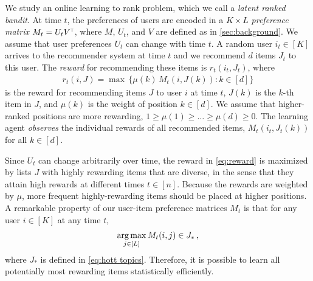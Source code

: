 
We study an online learning to rank problem, which we call a \emph{latent ranked bandit}. At time $t$, the preferences of users are encoded in a $K \times L$ \emph{preference matrix} $M_t = U_t V^\mathsf{\scriptscriptstyle T}$, where $M$, $U_t$, and $V$ are defined as in \cref{sec:background}. We assume that user preferences $U_t$ can change with time $t$. A random user $i_t \in [K]$ arrives to the recommender system at time $t$ and we recommend $d$ items $J_t$ to this user. The \emph{reward} for recommending these items is $r_t(i_t, J_t)$, where
\begin{align}
  r_t(i, J) =
  \max \, \{\mu(k) \, M_t(i, J(k)): k \in [d]\}
  \label{eq:reward}
\end{align}
is the reward for recommending items $J$ to user $i$ at time $t$, $J(k)$ is the $k$-th item in $J$, and $\mu(k)$ is the weight of position $k \in [d]$. We assume that higher-ranked positions are more rewarding, $1 \geq \mu(1) \geq \dots \geq \mu(d) \geq 0$. The learning agent \emph{observes} the individual rewards of all recommended items, $M_t(i_t, J_t(k))$ for all $k \in [d]$.


Since $U_t$ can change arbitrarily over time, the reward in \eqref{eq:reward} is maximized by lists $J$ with highly rewarding items that are diverse, in the sense that they attain high rewards at different times $t \in [n]$. Because the rewards are weighted by $\mu$, more frequent highly-rewarding items should be placed at higher positions. A remarkable property of our user-item preference matrices $M_t$ is that for any user $i \in [K]$ at any time $t$,
\begin{align*}
  \mathop{\rm arg\,max}_{j \in [L]} M_t(i, j) \in J_\ast\,,
\end{align*}
where $J_\ast$ is defined in \eqref{eq:hott topics}. Therefore, it is possible to learn all potentially most rewarding items statistically efficiently.

